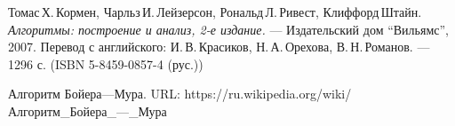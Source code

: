 \begin{thebibliography}{99}

Томас\,Х.\,Кормен, Чарльз\,И.\,Лейзерсон, Рональд\,Л.\,Ривест, Клиффорд\,Штайн.
{\itshape Алгоритмы: построение и анализ, 2-е издание.} --- Издательский дом \enquote{Вильямс}, 2007. Перевод с английского: И.\,В.\,Красиков, Н.\,А.\,Орехова, В.\,Н.\,Романов. --- 1296 с. (ISBN 5-8459-0857-4 (рус.))

Алгоритм Бойера—Мура. 
URL: https://ru.wikipedia.org/wiki/Алгоритм_Бойера_—_Мура

\end{thebibliography}
\pagebreak